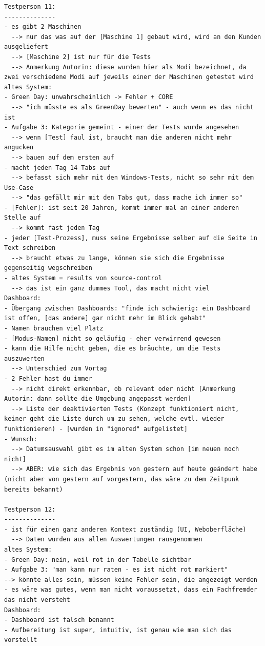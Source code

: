 \begin{lstlisting}[language={[LaTeX]TeX},inputencoding={utf8}]
Testperson 11:
--------------
- es gibt 2 Maschinen
  --> nur das was auf der [Maschine 1] gebaut wird, wird an den Kunden ausgeliefert
  --> [Maschine 2] ist nur für die Tests
  --> Anmerkung Autorin: diese wurden hier als Modi bezeichnet, da zwei verschiedene Modi auf jeweils einer der Maschinen getestet wird
altes System:
- Green Day: unwahrscheinlich -> Fehler + CORE
  --> "ich müsste es als GreenDay bewerten" - auch wenn es das nicht ist
- Aufgabe 3: Kategorie gemeint - einer der Tests wurde angesehen
  --> wenn [Test] faul ist, braucht man die anderen nicht mehr angucken
  --> bauen auf dem ersten auf
- macht jeden Tag 14 Tabs auf
  --> befasst sich mehr mit den Windows-Tests, nicht so sehr mit dem Use-Case
  --> "das gefällt mir mit den Tabs gut, dass mache ich immer so"
- [Fehler]: ist seit 20 Jahren, kommt immer mal an einer anderen Stelle auf
  --> kommt fast jeden Tag
- jeder [Test-Prozess], muss seine Ergebnisse selber auf die Seite in Text schreiben
  --> braucht etwas zu lange, können sie sich die Ergebnisse gegenseitig wegschreiben
- altes System = results von source-control
  --> das ist ein ganz dummes Tool, das macht nicht viel
Dashboard:
- Übergang zwischen Dashboards: "finde ich schwierig: ein Dashboard ist offen, [das andere] gar nicht mehr im Blick gehabt"
- Namen brauchen viel Platz
- [Modus-Namen] nicht so geläufig - eher verwirrend gewesen
- kann die Hilfe nicht geben, die es bräuchte, um die Tests auszuwerten
  --> Unterschied zum Vortag
- 2 Fehler hast du immer
  --> nicht direkt erkennbar, ob relevant oder nicht [Anmerkung Autorin: dann sollte die Umgebung angepasst werden]
  --> Liste der deaktivierten Tests (Konzept funktioniert nicht, keiner geht die Liste durch um zu sehen, welche evtl. wieder funktionieren) - [wurden in "ignored" aufgelistet]
- Wunsch: 
  --> Datumsauswahl gibt es im alten System schon [im neuen noch nicht]
  --> ABER: wie sich das Ergebnis von gestern auf heute geändert habe (nicht aber von gestern auf vorgestern, das wäre zu dem Zeitpunk bereits bekannt)

Testperson 12:
--------------
- ist für einen ganz anderen Kontext zuständig (UI, Weboberfläche)
  --> Daten wurden aus allen Auswertungen rausgenommen
altes System:
- Green Day: nein, weil rot in der Tabelle sichtbar
- Aufgabe 3: "man kann nur raten - es ist nicht rot markiert"
--> könnte alles sein, müssen keine Fehler sein, die angezeigt werden
- es wäre was gutes, wenn man nicht voraussetzt, dass ein Fachfremder das nicht versteht
Dashboard:
- Dashboard ist falsch benannt
- Aufbereitung ist super, intuitiv, ist genau wie man sich das vorstellt

\end{lstlisting}
